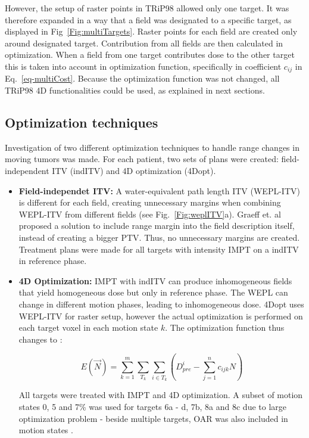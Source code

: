 However, the setup of raster points in TRiP98 allowed only one target. It was therefore expanded in a way that a field was designated to a specific target, as displayed in Fig~\ref{Fig:multiTargets}. 
Raster points for each field are created only around designated target. Contribution from all fields are then calculated in optimization. When a field from one target contributes 
dose to the other target this is taken into account in optimization function, specifically in coefficient $c_{ij}$ in Eq.~\ref{eq-multiCost}. Because the optimization function was not changed, 
all TRiP98 4D functionalities could be used, as explained in next sections.


\subsection{Optimization techniques}

Investigation of two different optimization techniques to handle range changes in moving tumors was made. For each patient, two sets of plans were created: field-independent ITV (indITV) and 4D optimization (4Dopt). 

\begin{itemize}
\item \textbf{Field-independet ITV:} A water-equivalent path length ITV (WEPL-ITV) is different for each field, creating unnecessary margins when combining WEPL-ITV from different fields (see Fig.~\ref{Fig:weplITV}a). 
Graeff et. al \cite{Graeff2012} proposed a solution to include range margin into the field description itself, instead of creating a bigger PTV. 
Thus, no unnecessary margins are created. Treatment plans were made for all targets with intensity IMPT on a indITV in reference phase.

\item \textbf{4D Optimization:} IMPT with indITV can produce inhomogeneous fields that yield homogeneous dose but only in reference phase. The WEPL can change in different motion phases, leading to inhomogeneous dose.
4Dopt uses WEPL-ITV for raster setup, however the actual optimization is performed on each target voxel in each motion state $k$. The optimization function thus changes to \cite{Graeff2012}:

\begin{equation}
\label{eq-4dmultiCost}
E(\vec{N}) = \sum_{k=1}^{m}\sum_{T_k} \sum_{i\in T_k} \left( D_{pre}^{i} -\sum_{j=1}^n c_{ijk}N\right)
\end{equation}

All targets were treated with IMPT and 4D optimization. A subset of motion states 0, 5 and 7\% was used for targets 6a - d, 7b, 8a and 8c due to large optimization problem - beside multiple targets, 
OAR was also included in motion states \cite{Graeff2012}.

\end{itemize}


